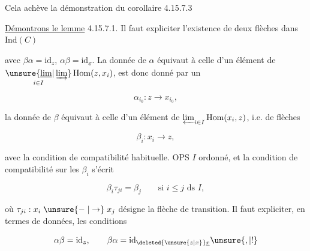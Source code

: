 Cela achève la démonstration du corollaire 4.15.7.3


\uline{Démontrons le lemme} 4.15.7.1. Il faut expliciter l'existence de deux flèches dans $\mathrm{Ind}(C)$


avec $\beta\alpha=\mathrm{id}_z$, $\alpha\beta=\mathrm{id}_{\underline{x}}$.  La donnée
%
%
de $\alpha$ équivaut à celle d'un élément de $\mathop{\unsure{\underline{\lim}|\varinjlim}}\limits_{i\in I}\operatorname{Hom}(z,x_i)$,  est donc donné par un

\[\alpha_{i_0}:z\longrightarrow x_{i_0},\]

la donnée de $\beta$ équivaut à celle d'un élément de $\varprojlim_{i\in I}\operatorname{Hom}(x_i,z)$, i.e. de flèches

\[\beta_i:x_i\longrightarrow z,\]

avec la condition de compatibilité habituelle.  OPS $I$ ordonné, et la condition  de compatibilité sur les $\beta_i$ s'écrit

\[\beta_i\tau_{ji}=\beta_j\qquad\text{si }i\leq j\text{ ds }I,\]

où $\tau_{ji}:x_i\mathrel{\unsure{\relbar|\to}}x_j$ désigne la flèche de transition. Il faut expliciter, en termes de  données, les conditions

\[\alpha\beta=\mathrm{id}_z,\qquad\beta\alpha=\mathrm{id}_{\deleted{\unsure{z|x}}\underline{x}}\unsure{,|!}\]


